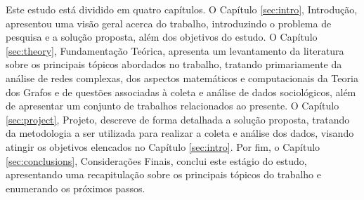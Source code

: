 Este estudo está dividido em quatro capítulos. O Capítulo \ref{sec:intro}, Introdução, apresentou uma visão geral acerca do trabalho, introduzindo o problema de pesquisa e a solução proposta, além dos objetivos do estudo. O Capítulo \ref{sec:theory}, Fundamentação Teórica, apresenta um levantamento da literatura sobre os principais tópicos abordados no trabalho, tratando primariamente da análise de redes complexas, dos aspectos matemáticos e computacionais da Teoria dos Grafos e de questões associadas à coleta e análise de dados sociológicos, além de apresentar um conjunto de trabalhos relacionados ao presente. O Capítulo \ref{sec:project}, Projeto, descreve de forma detalhada a solução proposta, tratando da metodologia a ser utilizada para realizar a coleta e análise dos dados, visando atingir os objetivos elencados no Capítulo \ref{sec:intro}. Por fim, o Capítulo \ref{sec:conclusions}, Considerações Finais, conclui este estágio do estudo, apresentando uma recapitulação sobre os principais tópicos do trabalho e enumerando os próximos passos.



    
